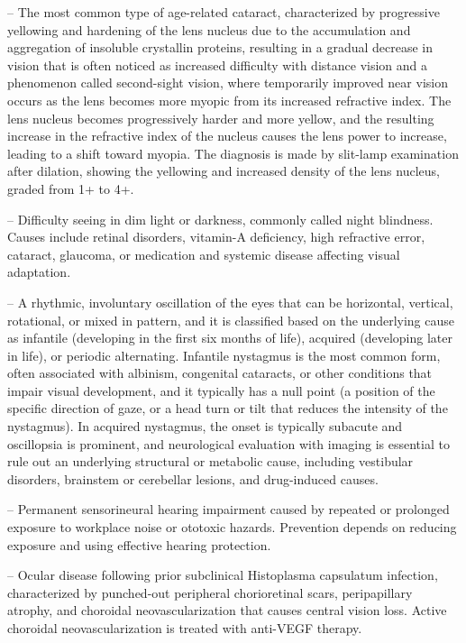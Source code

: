 -- The most common type of age-related cataract, characterized by progressive yellowing and hardening of the lens nucleus due to the accumulation and aggregation of insoluble crystallin proteins, resulting in a gradual decrease in vision that is often noticed as increased difficulty with distance vision and a phenomenon called second-sight vision, where temporarily improved near vision occurs as the lens becomes more myopic from its increased refractive index. The lens nucleus becomes progressively harder and more yellow, and the resulting increase in the refractive index of the nucleus causes the lens power to increase, leading to a shift toward myopia. The diagnosis is made by slit-lamp examination after dilation, showing the yellowing and increased density of the lens nucleus, graded from 1+ to 4+.

-- Difficulty seeing in dim light or darkness, commonly called night blindness. Causes include retinal disorders, vitamin-A deficiency, high refractive error, cataract, glaucoma, or medication and systemic disease affecting visual adaptation.

-- A rhythmic, involuntary oscillation of the eyes that can be horizontal, vertical, rotational, or mixed in pattern, and it is classified based on the underlying cause as infantile (developing in the first six months of life), acquired (developing later in life), or periodic alternating. Infantile nystagmus is the most common form, often associated with albinism, congenital cataracts, or other conditions that impair visual development, and it typically has a null point (a position of the specific direction of gaze, or a head turn or tilt that reduces the intensity of the nystagmus). In acquired nystagmus, the onset is typically subacute and oscillopsia is prominent, and neurological evaluation with imaging is essential to rule out an underlying structural or metabolic cause, including vestibular disorders, brainstem or cerebellar lesions, and drug-induced causes.

-- Permanent sensorineural hearing impairment caused by repeated or prolonged exposure to workplace noise or ototoxic hazards. Prevention depends on reducing exposure and using effective hearing protection.

-- Ocular disease following prior subclinical Histoplasma capsulatum infection, characterized by punched-out peripheral chorioretinal scars, peripapillary atrophy, and choroidal neovascularization that causes central vision loss. Active choroidal neovascularization is treated with anti-VEGF therapy.

